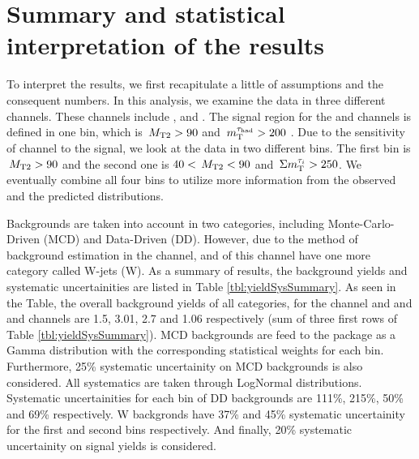 
\section[Statistics]{Summary and statistical interpretation of the results}\label{sec:stat}

To interpret the results, we first recapitulate a little of assumptions and the consequent numbers.
In this analysis, we examine the data in three different channels.
These channels include \tauTau, \muTau and \eTau.
The signal region for the \muTau and \eTau channels is defined in one bin, which is $\,{M_{\rm T2}} > 90$ and $\,m_{\rm T}^{\tau_{\rm had}} > 200$ .
Due to the sensitivity of \tauTau channel to the signal, we look at the data in two different bins.
The first bin is $\,{M_{\rm T2}} > 90$ and the second one is $40 < \,{M_{\rm T2}} < 90$ and $\,\Sigma m_{\rm T}^{\tau_i} > 250$.
We eventually combine all four bins to utilize more information from the observed and the predicted distributions.


Backgrounds are taken into account in two categories, including Monte-Carlo-Driven (MCD) and Data-Driven (DD).
However, due to the method of background estimation in the \tauTau channel, \binone and \bintwo of this channel have one more category called W-jets (W).
As a summary of results, the background yields and systematic uncertainities are listed in Table \ref{tbl:yieldSysSummary}.
As seen in the Table, the overall background yields of all categories, for the \tauTau channel \binone and \bintwo and \eTau and \muTau channels are  1.5, 3.01, 2.7 and 1.06 respectively (sum of three first rows of Table \ref{tbl:yieldSysSummary}).
MCD backgrounds are feed to the package as a Gamma distribution with the corresponding statistical weights for each bin.
Furthermore, 25\% systematic uncertainity on MCD backgrounds is also considered.
All systematics are taken through LogNormal distributions.
Systematic uncertainities for each bin of DD backgrounds are 111\%, 215\%, 50\% and 69\% respectively.  
W backgronds have 37\% and 45\% systematic uncertainity for the first and second bins respectively.
And finally, 20\% systematic uncertainity on signal yields is considered. 



